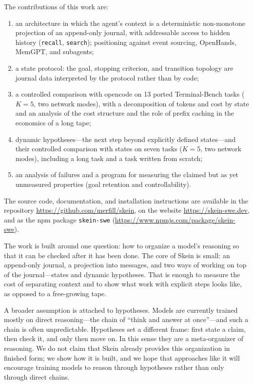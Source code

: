 \documentclass[11pt,a4paper]{article}
\begin{document}
The contributions of this work are:
\begin{enumerate}[leftmargin=1.4em,itemsep=0.2em]
  \item an architecture in which the agent's context is a deterministic non-monotone projection
  of an append-only journal, with addressable access to hidden history (\texttt{recall},
  \texttt{search}); positioning against event sourcing, OpenHands, MemGPT, and subagents;
  \item a state protocol: the goal, stopping criterion, and transition topology are journal
  data interpreted by the protocol rather than by code;
  \item a controlled comparison with opencode on 13 ported Terminal-Bench tasks ($K=5$, two
  network modes), with a decomposition of tokens and cost by state and an analysis of the cost
  structure and the role of prefix caching in the economics of a long tape;
  \item dynamic hypotheses---the next step beyond explicitly defined states---and their controlled
  comparison with states on seven tasks ($K=5$, two network modes), including a long task and a
  task written from scratch;
  \item an analysis of failures and a program for measuring the claimed but as yet unmeasured
  properties (goal retention and controllability).
\end{enumerate}

The source code, documentation, and installation instructions are available in the
repository \url{https://github.com/merfill/skein}, on the website
\url{https://skein-swe.dev}, and as the npm package \texttt{skein-swe}
(\url{https://www.npmjs.com/package/skein-swe}).

The work is built around one question: how to organize a model's reasoning so that it can be
checked after it has been done. The core of Skein is small: an append-only journal, a projection
into messages, and two ways of working on top of the journal---states and dynamic hypotheses. That
is enough to measure the cost of separating context and to show what work with explicit steps
looks like, as opposed to a free-growing tape.

A broader assumption is attached to hypotheses. Models are currently trained mostly on direct
reasoning---the chain of ``think and answer at once''---and such a chain is often unpredictable.
Hypotheses set a different frame: first state a claim, then check it, and only then move on. In
this sense they are a meta-organizer of reasoning. We do not claim that Skein already provides
this organization in finished form; we show how it is built, and we hope that approaches like it
will encourage training models to reason through hypotheses rather than only through direct
chains.
\end{document}
